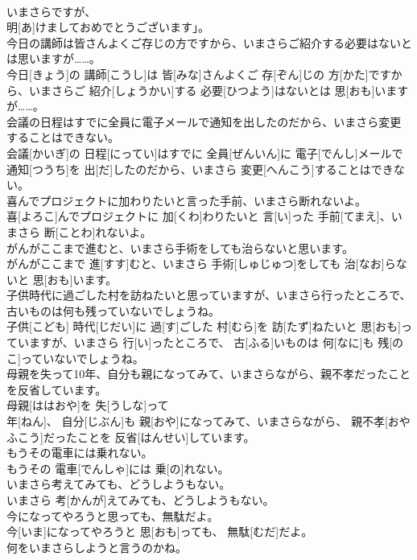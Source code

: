 \documentclass[8pt]{extreport}
\begin{document}
\begin{CJK}{UTF8}{min}
\\	いまさらですが、
\\	明[あ]けましておめでとうございます」。
\\	今日の講師は皆さんよくご存じの方ですから、いまさらご紹介する必要はないとは思いますが……。	
\\	今日[きょう]の 講師[こうし]は 皆[みな]さんよくご 存[ぞん]じの 方[かた]ですから、いまさらご 紹介[しょうかい]する 必要[ひつよう]はないとは 思[おも]いますが……。
\\	会議の日程はすでに全員に電子メールで通知を出したのだから、いまさら変更することはできない。	
\\	会議[かいぎ]の 日程[にってい]はすでに 全員[ぜんいん]に 電子[でんし]メールで 通知[つうち]を 出[だ]したのだから、いまさら 変更[へんこう]することはできない。
\\	喜んでプロジェクトに加わりたいと言った手前、いまさら断れないよ。	
\\	喜[よろこ]んでプロジェクトに 加[くわ]わりたいと 言[い]った 手前[てまえ]、いまさら 断[ことわ]れないよ。
\\	がんがここまで進むと、いまさら手術をしても治らないと思います。	
\\	がんがここまで 進[すす]むと、いまさら 手術[しゅじゅつ]をしても 治[なお]らないと 思[おも]います。
\\	子供時代に過ごした村を訪ねたいと思っていますが、いまさら行ったところで、古いものは何も残っていないでしょうね。	
\\	子供[こども] 時代[じだい]に 過[す]ごした 村[むら]を 訪[たず]ねたいと 思[おも]っていますが、いまさら 行[い]ったところで、 古[ふる]いものは 何[なに]も 残[のこ]っていないでしょうね。
\\	母親を失って10年、自分も親になってみて、いまさらながら、親不孝だったことを反省しています。	
\\	母親[ははおや]を 失[うしな]って 
\\	年[ねん]、 自分[じぶん]も 親[おや]になってみて、いまさらながら、 親不孝[おやふこう]だったことを 反省[はんせい]しています。
\\	もうその電車には乗れない。	
\\	もうその 電車[でんしゃ]には 乗[の]れない。
\\	いまさら考えてみても、どうしようもない。	
\\	いまさら 考[かんが]えてみても、どうしようもない。
\\	今になってやろうと思っても、無駄だよ。	
\\	今[いま]になってやろうと 思[おも]っても、 無駄[むだ]だよ。
\\	何をいまさらしようと言うのかね。	

\end{CJK}
\end{document}
